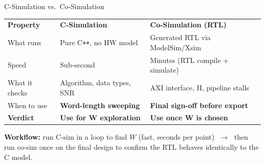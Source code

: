 \documentclass[aspectratio=169,12pt]{beamer}
\begin{document}
\begin{frame}{C-Simulation vs.\ Co-Simulation}
\vspace{0.04cm}
{\setlength{\extrarowheight}{2pt}
\begin{tabular}{p{2.8cm}p{5.4cm}p{5.2cm}}
\rowcolor{Navy}
\textbf{\color{white}Property} &
\textbf{\color{white}C-Simulation} &
\textbf{\color{white}Co-Simulation (RTL)} \\
What runs    & Pure C\texttt{++}, no HW model &
               Generated RTL via ModelSim/Xsim \\
Speed        & Sub-second &
               Minutes (RTL compile + simulate) \\
What it checks & Algorithm, data types, SNR &
                 AXI interface, II, pipeline stalls \\
When to use  & \textbf{Word-length sweeping} &
               \textbf{Final sign-off before export} \\
\rowcolor{Teal!10}
\textbf{Verdict} & \textbf{Use for W exploration} & \textbf{Use once W is chosen} \\
\end{tabular}}
\vspace{0.1cm}
\colorbox{Orange!10}{\parbox{\textwidth}{%
  \vspace{1pt}
  {\small\color{NavyDk}
    \textbf{Workflow:} run C-sim in a loop to find $W$
    (fast, seconds per point) $\;\to\;$
    then run co-sim once on the final design
    to confirm the RTL behaves identically to the C model.}
  \vspace{1pt}
}}
\end{frame}
\end{document}
